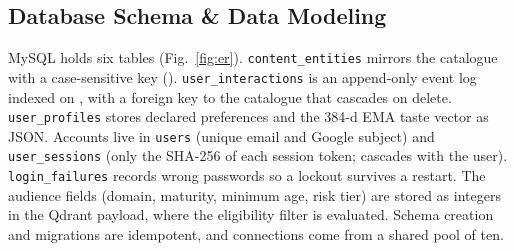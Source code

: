 \documentclass[11pt, a4paper]{article}
\begin{document}
\subsection{Database Schema \& Data Modeling}
\noindent
MySQL holds six tables (Fig.~\ref{fig:er}). \texttt{content\_entities} mirrors the catalogue with a case-sensitive  key (). \texttt{user\_interactions} is an append-only event log indexed on , with a foreign key to the catalogue that cascades on delete. \texttt{user\_profiles} stores declared preferences and the 384-d EMA taste vector as JSON. Accounts live in \texttt{users} (unique email and Google subject) and \texttt{user\_sessions} (only the SHA-256 of each session token; cascades with the user). \texttt{login\_failures} records wrong passwords so a lockout survives a restart. The audience fields (domain, maturity, minimum age, risk tier) are stored as integers in the Qdrant payload, where the eligibility filter is evaluated. Schema creation and migrations are idempotent, and connections come from a shared pool of ten.
\end{document}
